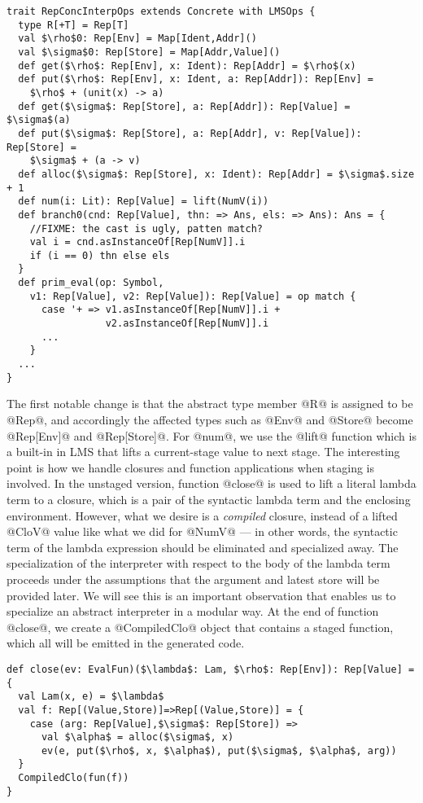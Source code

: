 \begin{lstlisting}
trait RepConcInterpOps extends Concrete with LMSOps {
  type R[+T] = Rep[T]
  val $\rho$0: Rep[Env] = Map[Ident,Addr]()
  val $\sigma$0: Rep[Store] = Map[Addr,Value]()
  def get($\rho$: Rep[Env], x: Ident): Rep[Addr] = $\rho$(x)
  def put($\rho$: Rep[Env], x: Ident, a: Rep[Addr]): Rep[Env] = 
    $\rho$ + (unit(x) -> a)
  def get($\sigma$: Rep[Store], a: Rep[Addr]): Rep[Value] = $\sigma$(a)
  def put($\sigma$: Rep[Store], a: Rep[Addr], v: Rep[Value]): Rep[Store] = 
    $\sigma$ + (a -> v)
  def alloc($\sigma$: Rep[Store], x: Ident): Rep[Addr] = $\sigma$.size + 1
  def num(i: Lit): Rep[Value] = lift(NumV(i))
  def branch0(cnd: Rep[Value], thn: => Ans, els: => Ans): Ans = {
    //FIXME: the cast is ugly, patten match?
    val i = cnd.asInstanceOf[Rep[NumV]].i
    if (i == 0) thn else els
  }
  def prim_eval(op: Symbol, 
    v1: Rep[Value], v2: Rep[Value]): Rep[Value] = op match {
      case '+ => v1.asInstanceOf[Rep[NumV]].i + 
                 v2.asInstanceOf[Rep[NumV]].i
      ...
    }
  ...
}
\end{lstlisting}

The first notable change is that the abstract type member @R@ is assigned to be @Rep@, and accordingly the affected 
types such as @Env@ and @Store@ become @Rep[Env]@ and @Rep[Store]@. For @num@, we use the @lift@ function which is a
built-in in LMS that lifts a current-stage value to next stage.
The interesting point is how we handle closures and function applications when staging is involved.
In the unstaged version, function @close@ is used to lift a literal lambda term to a closure, which
is a pair of the syntactic lambda term and the enclosing environment.
However, what we desire is a \textit{compiled} closure, instead of a lifted @CloV@ value like 
what we did for @NumV@ --- in other words, the syntactic term of the lambda expression should be 
eliminated and specialized away.
The specialization of the interpreter with respect to the body of the lambda term proceeds under the
assumptions that the argument and latest store will be provided later. 
We will see this is an important observation that enables us to specialize an abstract interpreter in a modular way.
At the end of function @close@, we create a @CompiledClo@ object that contains a staged function, which all will be
emitted in the generated code.

\begin{lstlisting}
def close(ev: EvalFun)($\lambda$: Lam, $\rho$: Rep[Env]): Rep[Value] = {
  val Lam(x, e) = $\lambda$
  val f: Rep[(Value,Store)]=>Rep[(Value,Store)] = { 
    case (arg: Rep[Value],$\sigma$: Rep[Store]) =>
      val $\alpha$ = alloc($\sigma$, x)
      ev(e, put($\rho$, x, $\alpha$), put($\sigma$, $\alpha$, arg)) 
  }
  CompiledClo(fun(f))
}
\end{lstlisting}

